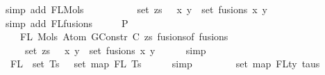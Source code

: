 \begin{isabellebody}
\ {\isacharparenleft}{\kern0pt}simp\ add{\isacharcolon}{\kern0pt}\ FL{\isacharunderscore}{\kern0pt}Mols{}{\isacharparenright}{\kern0pt}\isanewline
\ \ \isamarkupfalse%
\ \isamarkupfalse%
\isanewline
\ \ \ \ {\isachardoublequoteopen}{\isachardot}{\kern0pt}{\isachardot}{\kern0pt}{\isachardot}{\kern0pt}\ {\isacharequal}{\kern0pt}\ set\ zs\ {\isasymunion}\ {\isacharparenleft}{\kern0pt}{\isasymUnion}\ {\isacharparenleft}{\kern0pt}x{\isacharcomma}{\kern0pt}\ y{\isacharparenright}{\kern0pt}\ {\isasymin}\ set\ fusions{\isachardot}{\kern0pt}\ {\isacharbraceleft}{\kern0pt}x{\isacharcomma}{\kern0pt}\ y{\isacharbraceright}{\kern0pt}{\isacharparenright}{\kern0pt}{\isachardoublequoteclose}\isanewline
\ \ \ \ \isamarkupfalse%
\ {\isacharparenleft}{\kern0pt}simp\ add{\isacharcolon}{\kern0pt}\ FL{\isacharunderscore}{\kern0pt}fusions{\isacharparenright}{\kern0pt}\isanewline
\ \ \isamarkupfalse%
\ \isamarkupfalse%
\ P{}{}{\isacharcolon}{\kern0pt}\isanewline
\ \ \ \ {\isachardoublequoteopen}FL\ {\isacharparenleft}{\kern0pt}Mols{}\ {\isacharparenleft}{\kern0pt}Atom\ {\isacharparenleft}{\kern0pt}GConstr\ C{\isacharparenright}{\kern0pt}\ zs{\isacharparenright}{\kern0pt}\ {\isacharparenleft}{\kern0pt}fusions{\isacharunderscore}{\kern0pt}of\ fusions{\isacharparenright}{\kern0pt}{\isacharparenright}{\kern0pt}\ {\isacharequal}{\kern0pt}\isanewline
\ \ \ \ \ set\ zs\ {\isasymunion}\ {\isacharparenleft}{\kern0pt}{\isasymUnion}\ {\isacharparenleft}{\kern0pt}x{\isacharcomma}{\kern0pt}\ y{\isacharparenright}{\kern0pt}\ {\isasymin}\ set\ fusions{\isachardot}{\kern0pt}\ {\isacharbraceleft}{\kern0pt}x{\isacharcomma}{\kern0pt}\ y{\isacharbraceright}{\kern0pt}{\isacharparenright}{\kern0pt}{\isachardoublequoteclose}\isanewline
\ \ \ \ \isamarkupfalse%
\ simp\isanewline
\isanewline
\ \ \isamarkupfalse%
\ {\isachardoublequoteopen}{\isasymUnion}\ {\isacharparenleft}{\kern0pt}FL\ {\isacharbackquote}{\kern0pt}\ set\ Ts{\isacharparenright}{\kern0pt}\ {\isacharequal}{\kern0pt}\ {\isasymUnion}\ {\isacharparenleft}{\kern0pt}set\ {\isacharparenleft}{\kern0pt}map\ FL\ Ts{\isacharparenright}{\kern0pt}{\isacharparenright}{\kern0pt}{\isachardoublequoteclose}\isanewline
\ \ \ \ \isamarkupfalse%
\ simp\isanewline
\ \ \isamarkupfalse%
\ \isamarkupfalse%
\ {\isachardoublequoteopen}{\isachardot}{\kern0pt}{\isachardot}{\kern0pt}{\isachardot}{\kern0pt}\ {\isacharequal}{\kern0pt}\ {\isasymUnion}\ {\isacharparenleft}{\kern0pt}set\ {\isacharparenleft}{\kern0pt}map\ FLty\ taus{\isacharparenright}{\kern0pt}{\isacharparenright}{\kern0pt}{\isachardoublequoteclose}\isanewline

\end{isabellebody}
